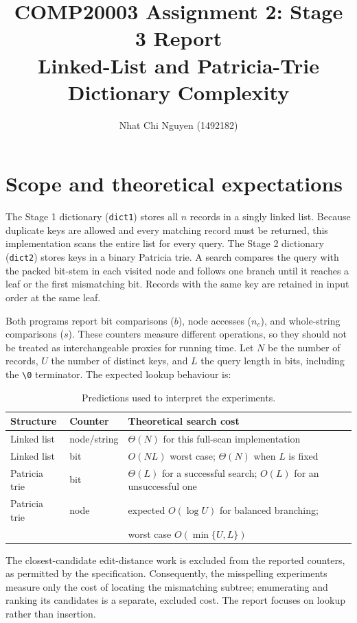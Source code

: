 \documentclass[10pt]{article}
\title{\vspace{-1.5em}COMP20003 Assignment 2: Stage 3 Report\\
\large Linked-List and Patricia-Trie Dictionary Complexity}
\author{Nhat Chi Nguyen (1492182)}
\date{}
\begin{document}
\maketitle
\vspace{-2.3em}

\section{Scope and theoretical expectations}

The Stage 1 dictionary (\texttt{dict1}) stores all $n$ records in a singly linked list.
Because duplicate keys are allowed and every matching record must be returned, this
implementation scans the entire list for every query. The Stage 2 dictionary
(\texttt{dict2}) stores keys in a binary Patricia trie. A search compares the query with
the packed bit-stem in each visited node and follows one branch until it reaches a leaf or
the first mismatching bit. Records with the same key are retained in input order at the
same leaf.

Both programs report bit comparisons ($b$), node accesses ($n_c$), and whole-string
comparisons ($s$). These counters measure different operations, so they should not be
treated as interchangeable proxies for running time. Let $N$ be the number of records,
$U$ the number of distinct keys, and $L$ the query length in bits, including the
\texttt{\textbackslash0} terminator. The expected lookup behaviour is:

\begin{table}[h]
\centering\small
\begin{tabular}{lll}
\toprule
Structure & Counter & Theoretical search cost \\
\midrule
Linked list & node/string & $\Theta(N)$ for this full-scan implementation \\
Linked list & bit & $O(NL)$ worst case; $\Theta(N)$ when $L$ is fixed \\
Patricia trie & bit & $\Theta(L)$ for a successful search; $O(L)$ for an unsuccessful one \\
Patricia trie & node & expected $O(\log U)$ for balanced branching; \\
& & worst case $O(\min\{U,L\})$ \\
\bottomrule
\end{tabular}
\caption{Predictions used to interpret the experiments.}
\label{tab:theory}
\end{table}

The closest-candidate edit-distance work is excluded from the reported counters, as
permitted by the specification. Consequently, the misspelling experiments measure only the
cost of locating the mismatching subtree; enumerating and ranking its candidates is a
separate, excluded cost. The report focuses on lookup rather than insertion.
\end{document}
